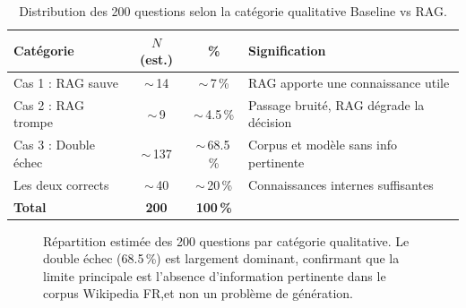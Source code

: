 \documentclass[12pt,a4paper]{article}
\begin{document}
\begin{table}[H]
\centering
\caption{Distribution des 200 questions selon la catégorie qualitative
  Baseline vs RAG.}
\label{tab:qualitative_distribution}
\begin{tabular}{@{} l c c p{6.5cm} @{}}
\toprule
\textbf{Catégorie} & \textbf{$N$ (est.)} & \textbf{\%}
  & \textbf{Signification} \\
\midrule
\rowcolor{green!8}
Cas 1 : RAG sauve     & $\sim$\,14 & $\sim$\,7\,\%
  & RAG apporte une connaissance utile \\
\rowcolor{red!6}
Cas 2 : RAG trompe    & $\sim$\,9  & $\sim$\,4.5\,\%
  & Passage bruité, RAG dégrade la décision \\
\rowcolor{gray!8}
Cas 3 : Double échec  & $\sim$\,137 & $\sim$\,68.5\,\%
  & Corpus et modèle sans info pertinente \\
Les deux corrects     & $\sim$\,40  & $\sim$\,20\,\%
  & Connaissances internes suffisantes \\
\midrule
\textbf{Total} & \textbf{200} & \textbf{100\,\%} & \\
\bottomrule
\end{tabular}
\end{table}


\begin{figure}[H]
\centering
{}
\caption{Répartition estimée des 200 questions par catégorie qualitative.
Le double échec (68.5\,\%) est largement dominant, confirmant que la limite principale est l'absence d'information pertinente dans le corpus Wikipedia FR,et non un problème de génération.}
\label{fig:qualitative_dist}
\end{figure}
\end{document}
